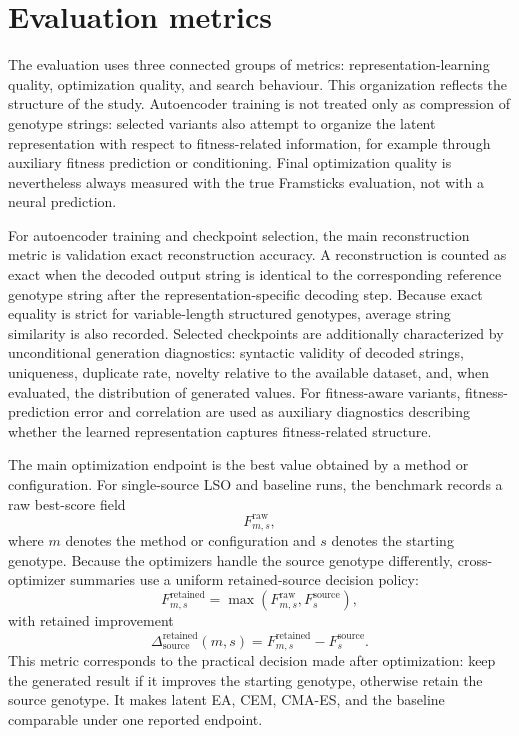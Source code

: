 
\section{Evaluation metrics}
\label{sec:Evaluation metrics}

The evaluation uses three connected groups of metrics: representation-learning quality, optimization quality, and search behaviour. This organization reflects the structure of the study. Autoencoder training is not treated only as compression of genotype strings: selected variants also attempt to organize the latent representation with respect to fitness-related information, for example through auxiliary fitness prediction or conditioning. Final optimization quality is nevertheless always measured with the true Framsticks \vertpos{} evaluation, not with a neural prediction.

For autoencoder training and checkpoint selection, the main reconstruction metric is validation exact reconstruction accuracy. A reconstruction is counted as exact when the decoded output string is identical to the corresponding reference genotype string after the representation-specific decoding step. Because exact equality is strict for variable-length structured genotypes, average string similarity is also recorded. Selected checkpoints are additionally characterized by unconditional generation diagnostics: syntactic validity of decoded \fone{} strings, uniqueness, duplicate rate, novelty relative to the available dataset, and, when evaluated, the distribution of generated \vertpos{} values. For fitness-aware variants, fitness-prediction error and correlation are used as auxiliary diagnostics describing whether the learned representation captures fitness-related structure.

The main optimization endpoint is the best \vertpos{} value obtained by a method or configuration. For single-source LSO and baseline runs, the benchmark records a raw best-score field
\[
F^{\mathrm{raw}}_{m,s},
\]
where \(m\) denotes the method or configuration and \(s\) denotes the starting genotype. Because the optimizers handle the source genotype differently, cross-optimizer summaries use a uniform retained-source decision policy:
\[
F^{\mathrm{retained}}_{m,s}
= \max\left(F^{\mathrm{raw}}_{m,s}, F^{\mathrm{source}}_{s}\right),
\]
with retained improvement
\[
\Delta^{\mathrm{retained}}_{\mathrm{source}}(m,s)
= F^{\mathrm{retained}}_{m,s} - F^{\mathrm{source}}_{s}.
\]
This metric corresponds to the practical decision made after optimization: keep the generated result if it improves the starting genotype, otherwise retain the source genotype. It makes latent EA, CEM, CMA-ES, and the baseline comparable under one reported endpoint.

